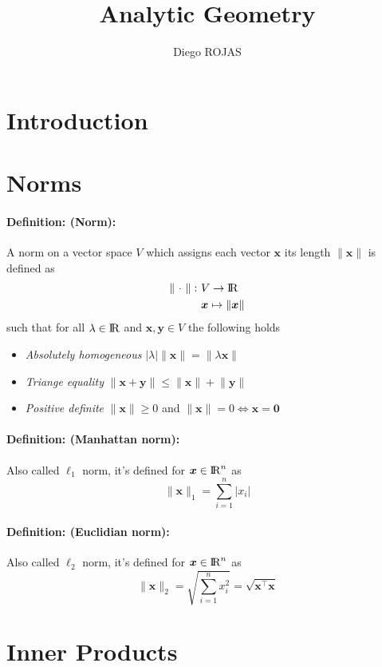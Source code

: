 \documentclass[12pt]{article}
\title{Analytic Geometry}
\author{Diego ROJAS}
\newcommand{\R}{{\rm I\!R}}
\newcommand{\bx}{{\bm{x}}}
\newcommand{\by}{{\bm{y}}}
\newcommand{\0}[0]{\bm{0}}
\newcommand{\norm}[1]{\lVert#1\rVert}
\newcommand{\xdefinition}[2]{\paragraph{\colorbox{#1!30}{\textbf{Definition:}} (#2):}}
\begin{document}
\maketitle

\section{Introduction}

\section{Norms}

\xdefinition{red}{Norm} A norm on a vector space $V$ which assigns each vector $\bx$ its length $\norm{\bx}$ is defined as
%
\begin{equation}
\begin{aligned}
	\norm{\ \cdot \ } : \ &V \rightarrow \R \\
	                      &\bx \mapsto \norm{\bx} 
\end{aligned}
\end{equation}
%
such that for all $\lambda \in \R$ and $\bx,\by \in V$ the following holds
%
\begin{itemize}
	\item \textit{Absolutely homogeneous} $|\lambda| \norm{\bx} = \norm{\lambda \bx}$
	\item \textit{Triange equality} $\norm{\bx + \by} \leqslant \norm{\bx} + \norm{\by}$
	\item \textit{Positive definite} $\norm{\bx} \geqslant 0$ and $\norm{\bx} = 0 \iff \bx = \0$
\end{itemize}

\xdefinition{blue}{Manhattan norm} Also called $\ell_1$ norm, it's defined for $\bx \in \R^n$ as
%
\begin{equation}
	\norm{\bx}_1 = \sum\limits_{i=1}^n |x_i|
\end{equation}

\xdefinition{blue}{Euclidian norm} Also called $\ell_2$ norm, it's defined for $\bx \in \R^n$ as
%
\begin{equation}
	\norm{\bx}_2 = \sqrt{\sum\limits_{i=1}^{n} x_i^2} = \sqrt{\bx^\top \bx}
\end{equation}

\section{Inner Products}
\end{document}
